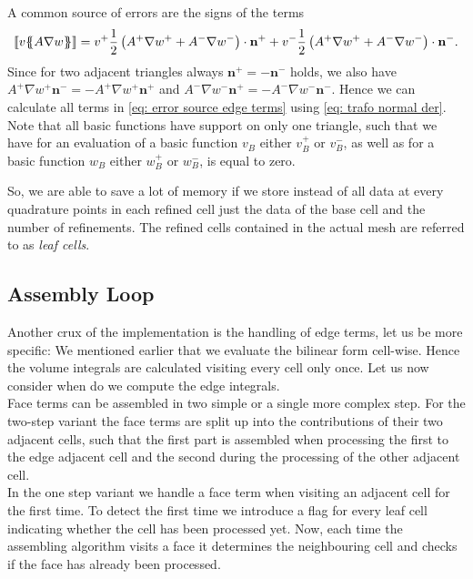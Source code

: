 \begin{example}
A common source of errors are the signs of the terms
\begin{align}
	\llbracket v \{\!\!\{  A \nabla w  \}\!\!\} \rrbracket = v^+ \frac 1 2  \left(A^+ \nabla w^+ + A^- \nabla w^-\right) \cdot \mathbf n^+ + v^- \frac 1 2 \left(A^+ \nabla w^+ + A^- \nabla w^-\right) \cdot \mathbf n^-. \label{eq: error source edge terms}
\end{align}
Since for two adjacent triangles always $\mathbf n^+ = - \mathbf n^-$ holds, we also have $A^+ \nabla w^+ \mathbf n^-= -A^+ \nabla w^+ \mathbf n^+$ and $A^- \nabla w^- \mathbf n^+= -A^- \nabla w^- \mathbf n^-$. Hence we can calculate all terms in \eqref{eq: error source edge terms} using \eqref{eq: trafo normal der}. Note that all basic functions have support on only one triangle, such that we have for an evaluation of a basic function $v_B$ either $v_B^+$ or $v_B^-$, as well as for a basic function $w_B$ either $w_B^+$ or $w_B^-$, is equal to zero.

So, we are able to save a lot of memory if we store instead of all data at every quadrature points in each refined cell just the data of the base cell and the number of refinements. The refined cells contained in the actual mesh are referred to as \emph{leaf cells}.
\end{example}

\subsection{Assembly Loop}\label{subsec: assembly loop}
Another crux of the implementation is the handling of edge terms, let us be more specific: We mentioned earlier that we evaluate the bilinear form cell-wise. Hence the volume integrals are calculated visiting every cell only once. Let us now consider when do we compute the edge integrals.\\

Face terms can be assembled in two simple or a single more complex step.
For the two-step variant the face terms are split up into the contributions of their two adjacent cells, such that the first part is assembled when processing the first to the edge adjacent cell and the second during the processing of the other adjacent cell. \\
In the one step variant we handle a face term when visiting an adjacent cell for the first time. To detect the first time we introduce a flag for every leaf cell indicating whether the cell has been processed yet. Now, each time the assembling algorithm visits a face it determines the neighbouring cell and checks if the face has already been processed. 

